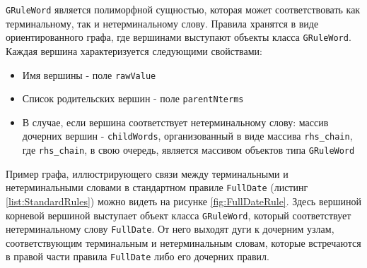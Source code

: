 \lstinline{GRuleWord} является полиморфной сущностью, которая может соответствовать как терминальному, так и нетерминальному слову. Правила хранятся в виде ориентированного графа, где вершинами выступают объекты класса \lstinline{GRuleWord}. Каждая вершина характеризуется следующими свойствами:
\begin{itemize}
  \item Имя вершины - поле \lstinline{rawValue}
  \item Список родительских вершин - поле \lstinline{parentNterms}
  \item В случае, если вершина соответствует нетерминальному слову: массив дочерних вершин - \lstinline{childWords}, организованный в виде массива \lstinline{rhs_chain}, где \lstinline{rhs_chain}, в свою очередь, является массивом объектов типа \lstinline{GRuleWord}
\end{itemize}
Пример графа, иллюстрирующего связи между терминальными и нетерминальными словами в стандартном правиле \lstinline{FullDate} (листинг \ref{list:StandardRules}) можно видеть на рисунке \ref{fig:FullDateRule}. Здесь вершиной корневой вершиной выступает объект класса \lstinline{GRuleWord}, который соответствует нетерминальному слову \lstinline{FullDate}. От него выходят дуги к дочерним узлам, соответствующим терминальным и нетерминальным словам, которые встречаются в правой части правила \lstinline{FullDate} либо его дочерних правил.
